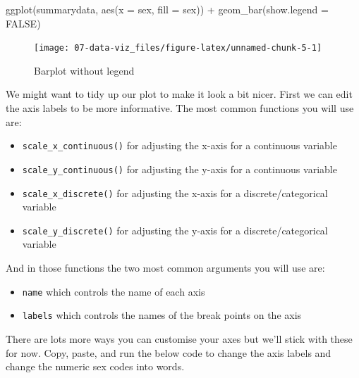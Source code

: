 \documentclass[
  oneside]{book}
\newenvironment{Shaded}{\begin{snugshade}}{\end{snugshade}}
\newcommand{\AttributeTok}[1]{\textcolor[rgb]{0.77,0.63,0.00}{#1}}
\newcommand{\ConstantTok}[1]{\textcolor[rgb]{0.00,0.00,0.00}{#1}}
\newcommand{\FunctionTok}[1]{\textcolor[rgb]{0.00,0.00,0.00}{#1}}
\newcommand{\NormalTok}[1]{#1}
\newcommand{\SpecialCharTok}[1]{\textcolor[rgb]{0.00,0.00,0.00}{#1}}
\providecommand{\tightlist}{%
  \setlength{\itemsep}{0pt}\setlength{\parskip}{0pt}}
\begin{document}
\begin{Shaded}
\begin{Highlighting}[]
\FunctionTok{ggplot}\NormalTok{(summarydata, }\FunctionTok{aes}\NormalTok{(}\AttributeTok{x =}\NormalTok{ sex, }\AttributeTok{fill =}\NormalTok{ sex)) }\SpecialCharTok{+}
  \FunctionTok{geom\_bar}\NormalTok{(}\AttributeTok{show.legend =} \ConstantTok{FALSE}\NormalTok{)}
\end{Highlighting}
\end{Shaded}

\begin{figure}

{\centering \texttt{[image: 07-data-viz\_files/figure-latex/unnamed-chunk-5-1]} 

}

\caption{Barplot without legend}\label{fig:unnamed-chunk-5}
\end{figure}

We might want to tidy up our plot to make it look a bit nicer. First we can edit the axis labels to be more informative. The most common functions you will use are:

\begin{itemize}
\tightlist
\item
  \texttt{scale\_x\_continuous()} for adjusting the x-axis for a continuous variable
\item
  \texttt{scale\_y\_continuous()} for adjusting the y-axis for a continuous variable
\item
  \texttt{scale\_x\_discrete()} for adjusting the x-axis for a discrete/categorical variable
\item
  \texttt{scale\_y\_discrete()} for adjusting the y-axis for a discrete/categorical variable
\end{itemize}

And in those functions the two most common arguments you will use are:

\begin{itemize}
\tightlist
\item
  \texttt{name} which controls the name of each axis
\item
  \texttt{labels} which controls the names of the break points on the axis
\end{itemize}

There are lots more ways you can customise your axes but we'll stick with these for now. Copy, paste, and run the below code to change the axis labels and change the numeric sex codes into words.
\end{document}
